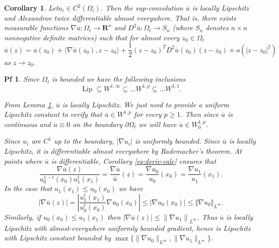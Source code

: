 \documentclass[10pt,a4paper]{amsart}
\newtheorem{cor}{Corollary}
\newtheorem{pf}{Pf}
\begin{document}
\begin{cor}
  \label{org60a33f1} Let\(u_i \in C^2(\Omega_i)\). Then the sup-convolution \(\overline{u}\) is locally Lipschitz
and Alexandrov twice differentiable almost everywhere. That is, there exists
measurable functions \(\nabla \overline{u} : \Omega_t \to \mathbf{R}^n\) and \(D^2 \overline{u} : \Omega_t
\to S_n\) (where \(S_n\) denotes \(n\times n\) nonnegative definite matrices) such that for almost
every \(z_0 \in \Omega_t\)
  \[ \overline{u}(z) = \overline{u}(z_0) + \langle \nabla \overline{u} (z_0), z-z_0\rangle +
\frac{1}{2} (z-z_0)^T D^2 \overline{u} (z_0) (z-z_0) + o (|z-z_0|^2)
  \] as \(z \to z_0\).
\end{cor}

\begin{pf} Since \(\Omega_t\) is bounded we have the following inclusions
  \[ \operatorname{Lip} \subseteq W^{1,\infty} \subseteq \dots W^{1,p} \subseteq \dots W^{1,1}.
  \]

From Lemma \ref{org60a33f1}, \(\overline{u}\) is locally Lipschitz. We just need
to provide a uniform Lipschitz constant to verify that \(\overline{u} \in
W^{1,p}\) for every \(p \geq 1\). Then since \(\overline{u}\) is continuous and
\(\overline{u} \equiv 0\) on the boundary \(\partial \Omega_t\) we will have \(\overline{u} \in
W^{1,p}_0\).

Since \(u_i\) are $C^1$ up to the boundary, \(|\nabla u_i|\) is uniformly bounded. Since \(\overline{u}\) is locally Lipschitz, it is differentiable almost
everywhere by Rademacher's theorem. At points where \(\overline{u}\) is
differentiable, Corollary \ref{eq:deriv-calc} ensures that
  \[ \frac{\nabla \overline{u}(z)}{u_0^{1-t}(x_0)u_1^t(x_1)} =\frac{\nabla
\overline{u}}{\overline{u}}(z) = \frac{\nabla u_0}{u_0}(x_0) = \frac{\nabla u_1}{u_1}
(x_1).
  \] In the case that \(u_1(x_1) \leq u_0(x_0)\) we have
  \[ |\nabla \overline{u}(z)| = \left|\frac{u_1^t(x_1)}{u_0^t(x_0)}\nabla u_0(x_0)\right|
\leq \left|\nabla u_0(x_0)\right| \leq \left\Vert \nabla u_0\right\Vert_{L^{\infty}}.
  \] Similarly, if \(u_0(x_0) \leq u_1(x_1)\) then $\left|\nabla \overline{u}(z)\right| \leq \left\|\nabla u_1\right\|_{L^{\infty}}$. Thus \(\overline{u}\) is locally Lipschitz with almost-everywhere uniformly
bounded gradient, hence is Lipschitz with Lipschitz constant bounded by \(\max
\{\|\nabla u_0\|_{L^{\infty}}, \|\nabla u_1\|_{L^{\infty}}\}\).
\end{pf}
\end{document}
